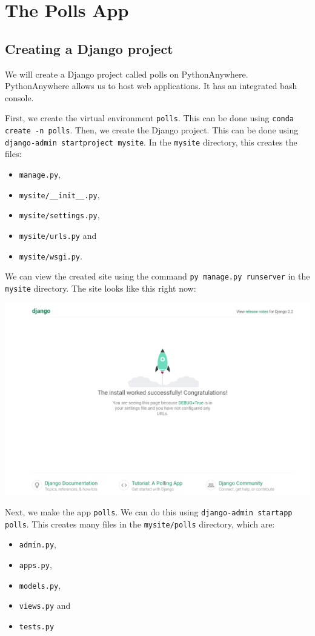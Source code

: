 \documentclass[a4paper, openany]{memoir}
\begin{document}
    \chapter{The Polls App}

    \section{Creating a Django project}
    We will create a Django project called polls on PythonAnywhere. PythonAnywhere allows us to host web applications. It has an integrated bash console.

    \noindent First, we create the virtual environment \texttt{polls}. This can be done using \texttt{conda create -n polls}. Then, we create the Django project. This can be done using \texttt{django-admin startproject mysite}. In the \texttt{mysite} directory, this creates the files:
    \begin{itemize}
        \item \texttt{manage.py},
        \item \texttt{mysite/\_\_init\_\_.py},
        \item \texttt{mysite/settings.py}, 
        \item \texttt{mysite/urls.py} and 
        \item \texttt{mysite/wsgi.py}.
    \end{itemize}
    We can view the created site using the command \texttt{py manage.py runserver} in the \texttt{mysite} directory. The site looks like this right now:
    \begin{center}
        \includegraphics[scale=0.4]{src/Django1.PNG}
    \end{center}
    Next, we make the app \texttt{polls}. We can do this using \texttt{django-admin startapp polls}. This creates many files in the \texttt{mysite/polls} directory, which are: 
    \begin{itemize}
        \item \texttt{admin.py}, 
        \item \texttt{apps.py}, 
        \item \texttt{models.py}, 
        \item \texttt{views.py} and 
        \item \texttt{tests.py}
    \end{itemize}
    \newpage
\end{document}
